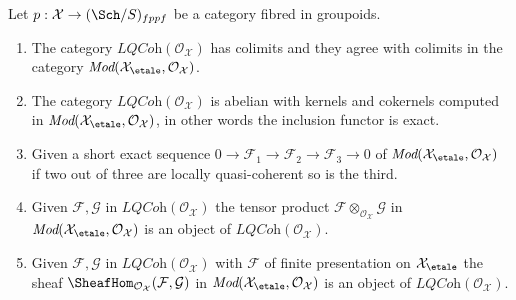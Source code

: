 %
\begin{lemma}
\label{lemma-lqc-colimits}
Let $p : \mathcal{X} \to (\Sch/S)_{fppf}$ be a category fibred in
groupoids.
\begin{enumerate}
\item The category $\textit{LQCoh}(\mathcal{O}_\mathcal{X})$
has colimits and they agree with colimits in the category
$\textit{Mod}(\mathcal{X}_\etale, \mathcal{O}_\mathcal{X})$.
\item The category $\textit{LQCoh}(\mathcal{O}_\mathcal{X})$
is abelian with kernels and cokernels computed in
$\textit{Mod}(\mathcal{X}_\etale, \mathcal{O}_\mathcal{X})$,
in other words the inclusion functor is exact.
\item Given a short exact sequence
$0 \to \mathcal{F}_1 \to \mathcal{F}_2 \to \mathcal{F}_3 \to 0$ of
$\textit{Mod}(\mathcal{X}_\etale, \mathcal{O}_\mathcal{X})$
if two out of three are locally quasi-coherent so is the third.
\item Given $\mathcal{F}, \mathcal{G}$ in
$\textit{LQCoh}(\mathcal{O}_\mathcal{X})$
the tensor product $\mathcal{F} \otimes_{\mathcal{O}_\mathcal{X}} \mathcal{G}$
in $\textit{Mod}(\mathcal{X}_\etale, \mathcal{O}_\mathcal{X})$
is an object of $\textit{LQCoh}(\mathcal{O}_\mathcal{X})$.
\item Given $\mathcal{F}, \mathcal{G}$ in
$\textit{LQCoh}(\mathcal{O}_\mathcal{X})$
with $\mathcal{F}$ of finite presentation on
$\mathcal{X}_\etale$ the sheaf
$\SheafHom_{\mathcal{O}_\mathcal{X}}(\mathcal{F}, \mathcal{G})$
in $\textit{Mod}(\mathcal{X}_\etale, \mathcal{O}_\mathcal{X})$
is an object of $\textit{LQCoh}(\mathcal{O}_\mathcal{X})$.
\end{enumerate}
\end{lemma}

